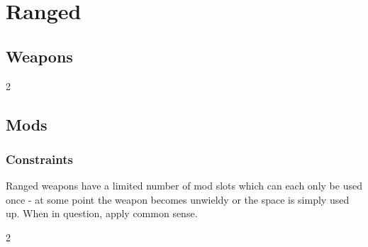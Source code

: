 \pagebreak %
\section{Ranged}
\label{sec:rangedweapons}
\subsection{Weapons}
\newcommand{\lastgroup}{ }
\begin{multicols}{2}
\end{multicols}

\newpage
\subsection{Mods}
\subsubsection{Constraints}
Ranged weapons have a limited number of mod slots which can each only be used once - at some point the weapon becomes unwieldy or the space is simply used up. When in question, apply common sense.
\par

\begin{multicols}{2}
\end{multicols}

